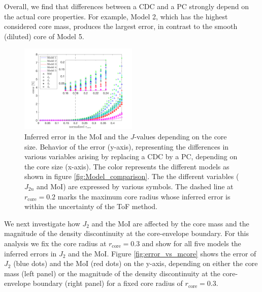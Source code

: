 \documentclass[usenatbib]{mnras}
\newcommand{\sub}[1]{_{\text{#1}}}
\begin{document}
Overall, we find that differences between a CDC and a PC strongly depend on the actual core properties. For example, Model 2, which has the highest considered core mass, produces the largest error, in contrast to the smooth (diluted) core of Model 5. \\
\begin{figure}
    \centering
    \includegraphics[width = 0.5\textwidth]{Figures/all_kind_of_stuff_in_one.png}
    \caption{Inferred error in the MoI and the $J$-values depending on the core size. Behavior of the error (y-axis), representing the differences in various variables arising by replacing a CDC by a PC, depending on the core size (x-axis). The color represents the different models as shown in figure \ref{fig:Model_comparison}. The the different variables ($J_{2n}$ and MoI) are expressed by various symbols. The dashed line at $r\sub{core}=0.2$ marks the maximum core radius whose inferred error is within the uncertainty of the ToF method.}
    \label{fig:all_error_J2}
\end{figure}
We next investigate how $J_2$ and the MoI are affected by the core mass and the magnitude of the density discontinuity at the core-envelope boundary. 
For this analysis we fix the core radius at $r\sub{core}=0.3$ and show for all five models the inferred errors in $J_2$ and the MoI.
Figure \ref{fig:error_vs_mcore} shows the error of $J_{2}$ (blue dots) and the MoI (red dots) on the y-axis, depending on either the core mass (left panel) or the magnitude of the density discontinuity at the core-envelope boundary (right panel) for a fixed core radius of $r\sub{core}=0.3$. 
\end{document}
